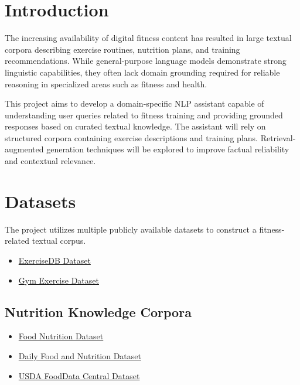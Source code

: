 \documentclass[fleqn,moreauthors,10pt]{ds_report}
\affiliation{\textit{Advisors: Aleš Žagar}}
\begin{document}
\flushbottom
\maketitle
\thispagestyle{empty}

\section*{Introduction}

The increasing availability of digital fitness content has resulted in large textual corpora describing exercise routines, nutrition plans, and training recommendations. While general-purpose language models demonstrate strong linguistic capabilities, they often lack domain grounding required for reliable reasoning in specialized areas such as fitness and health.

This project aims to develop a domain-specific NLP assistant capable of understanding user queries related to fitness training and providing grounded responses based on curated textual knowledge. The assistant will rely on structured corpora containing exercise descriptions and training plans. Retrieval-augmented generation techniques will be explored to improve factual reliability and contextual relevance.

\section*{Datasets}

The project utilizes multiple publicly available datasets to construct a fitness-related textual corpus.

\begin{itemize}
\item \href{https://www.kaggle.com/datasets/exercisedb/fitness-exercises-dataset}{ExerciseDB Dataset}
\item \href{https://www.kaggle.com/datasets/ambarishdeb/gym-exercises-dataset}{Gym Exercise Dataset}
\end{itemize}

\subsection*{Nutrition Knowledge Corpora}

\begin{itemize}
\item \href{https://www.kaggle.com/datasets/utsavdey1410/food-nutrition-dataset}{Food Nutrition Dataset}
\item \href{https://www.kaggle.com/datasets/adilshamim8/daily-food-and-nutrition-dataset}{Daily Food and Nutrition Dataset}
\item \href{https://fdc.nal.usda.gov/download-datasets}{USDA FoodData Central Dataset}
\end{itemize}
\end{document}
